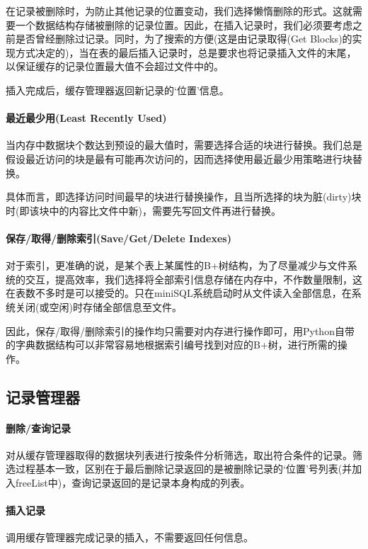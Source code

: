 \documentclass[UTF8]{ctexrep} %
\begin{document}
在记录被删除时，为防止其他记录的位置变动，我们选择懒惰删除的形式。这就需要一个数据结构存储被删除的记录位置。因此，在插入记录时，我们必须要考虑之前是否曾经删除过记录。同时，为了搜索的方便(这是由记录取得(Get Blocks)的实现方式决定的)，当在表的最后插入记录时，总是要求也将记录插入文件的末尾，以保证缓存的记录位置最大值不会超过文件中的。

插入完成后，缓存管理器返回新记录的‘位置’信息。

\paragraph{最近最少用(Least Recently Used)}
当内存中数据块个数达到预设的最大值时，需要选择合适的块进行替换。我们总是假设最近访问的块是最有可能再次访问的，因而选择使用最近最少用策略进行块替换。

具体而言，即选择访问时间最早的块进行替换操作，且当所选择的块为脏(dirty)块时(即该块中的内容比文件中新)，需要先写回文件再进行替换。

\paragraph{保存/取得/删除索引(Save/Get/Delete Indexes)}
对于索引，更准确的说，是某个表上某属性的B+树结构，为了尽量减少与文件系统的交互，提高效率，我们选择将全部索引信息存储在内存中，不作数量限制，这在表数不多时是可以接受的。只在miniSQL系统启动时从文件读入全部信息，在系统关闭(或空闲)时存储全部信息至文件。

因此，保存/取得/删除索引的操作均只需要对内存进行操作即可，用Python自带的字典数据结构可以非常容易地根据索引编号找到对应的B+树，进行所需的操作。

\subsection{记录管理器}
\paragraph{删除/查询记录}	
对从缓存管理器取得的数据块列表进行按条件分析筛选，取出符合条件的记录。筛选过程基本一致，区别在于最后删除记录返回的是被删除记录的‘位置’号列表(并加入freeList中)，查询记录返回的是记录本身构成的列表。

\paragraph{插入记录}
调用缓存管理器完成记录的插入，不需要返回任何信息。
\end{document}
